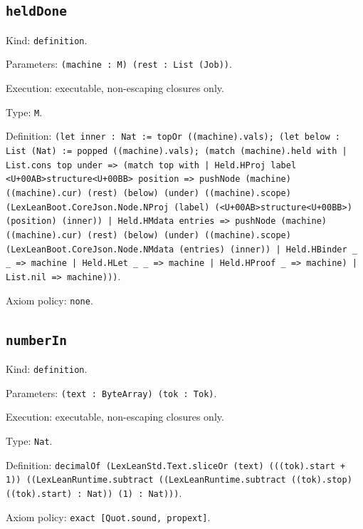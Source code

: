\documentclass[11pt]{article}
\begin{document}
\subsection*{\texttt{heldDone}}
\noindent Kind: \texttt{definition}.\par
\noindent Parameters: \texttt{(machine : M) (rest : List (Job))}.\par
\noindent Execution: executable, non-escaping closures only.\par
\noindent Type: \texttt{M}.\par
\noindent Definition: \texttt{(let inner : Nat := topOr ((machine).vals); (let below : List (Nat) := popped ((machine).vals); (match (machine).held with | List.cons top under => (match top with | Held.HProj label <U+00AB>structure<U+00BB> position => pushNode (machine) ((machine).cur) (rest) (below) (under) ((machine).scope) (LexLeanBoot.CoreJson.Node.NProj (label) (<U+00AB>structure<U+00BB>) (position) (inner)) | Held.HMdata entries => pushNode (machine) ((machine).cur) (rest) (below) (under) ((machine).scope) (LexLeanBoot.CoreJson.Node.NMdata (entries) (inner)) | Held.HBinder \_ \_ => machine | Held.HLet \_ \_ => machine | Held.HProof \_ => machine) | List.nil => machine)))}.\par
\noindent Axiom policy: \texttt{none}.\par
\subsection*{\texttt{numberIn}}
\noindent Kind: \texttt{definition}.\par
\noindent Parameters: \texttt{(text : ByteArray) (tok : Tok)}.\par
\noindent Execution: executable, non-escaping closures only.\par
\noindent Type: \texttt{Nat}.\par
\noindent Definition: \texttt{decimalOf (LexLeanStd.Text.sliceOr (text) (((tok).start + 1)) ((LexLeanRuntime.subtract ((LexLeanRuntime.subtract ((tok).stop) ((tok).start) : Nat)) (1) : Nat)))}.\par
\noindent Axiom policy: \texttt{exact [Quot.sound, propext]}.\par
\end{document}
